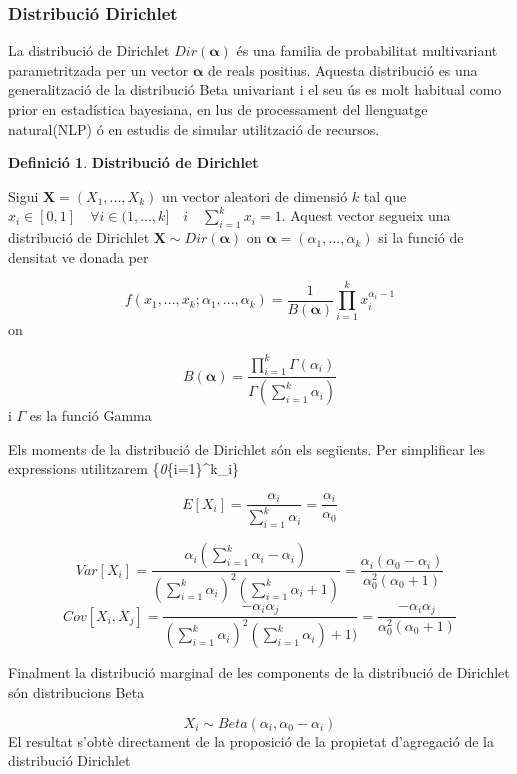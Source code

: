 \documentclass[
  catalan,
]{article}
\theoremstyle{definition}
\newtheorem{definition}{Definició}[section]
\theoremstyle{definition}
\theoremstyle{definition}
\theoremstyle{definition}
\theoremstyle{remark}
\begin{document}
\subsubsection{Distribució Dirichlet}\label{distribuciuxf3-dirichlet}

La distribució de Dirichlet \(Dir(\boldsymbol{\alpha})\) és una familia de probabilitat multivariant parametritzada per un vector \(\boldsymbol{\alpha}\) de reals positius. Aquesta distribució es una generalització de la distribució Beta univariant i el seu ús es molt habitual como prior en estadística bayesiana, en lus de processament del llenguatge natural(NLP) ó en estudis de simular utilització de recursos.

\begin{definition}
\textbf{Distribució de Dirichlet}

Sigui \(\mathbf{X}=(X_1,...,X_k)\) un vector aleatori de dimensió \(k\) tal que \(x_i \in [0,1]  \quad  \forall i \in (1,...,k] \quad i \quad \sum_{i=1}^k x_i=1\). Aquest vector segueix una distribució de Dirichlet \(\mathbf{X} \sim  Dir(\boldsymbol{\alpha})\) on \(\boldsymbol{\alpha}=(\alpha_1,...,\alpha_k)\) si la funció de densitat ve donada per

\[
f(x_1,...,x_k;\alpha_1,...,\alpha_k)= \dfrac {1}{B(\boldsymbol{\alpha})} \prod_{i=1}^k x_i^{\alpha_i-1}
\]
on

\[
B(\boldsymbol{\alpha})= \dfrac {\prod_{i=1}^k \Gamma(\alpha_i)}{\Gamma(\sum_{i=1}^k\alpha_i)}
\]
i \(\Gamma\) es la funció Gamma
\end{definition}

Els moments de la distribució de Dirichlet són els següents. Per simplificar les expressions utilitzarem \{\alpha\emph{0\sum}\{i=1\}\^{}k\alpha\_i\}

\[
E[X_i] = \dfrac {\alpha_i} {\sum_{i=1}^k\alpha_i}=\dfrac {\alpha_i} {\alpha_0}
\]

\[
Var[X_i] =\dfrac {\alpha_i(\sum_{i=1}^k\alpha_i -\alpha_i)}{(\sum_{i=1}^k\alpha_i)^2(\sum_{i=1}^k\alpha_i+1)}=\dfrac {\alpha_i(\alpha_0 -\alpha_i)}{\alpha_0^2(\alpha_0+1)}
\]
\[
Cov[X_i,X_j]=\dfrac {-\alpha_i \alpha_j}{(\sum_{i=1}^k\alpha_i)^2(\sum_{i=1}^k\alpha_i)+1)}=\dfrac {-\alpha_i \alpha_j}{\alpha_0^2(\alpha_0+1)}
\]

Finalment la distribució marginal de les components de la distribució de Dirichlet són distribucions Beta

\[
X_i \sim Beta(\alpha_i, \alpha_0-\alpha_i)
\]
El resultat s'obtè directament de la proposició de la propietat d'agregació de la distribució Dirichlet
\end{document}
